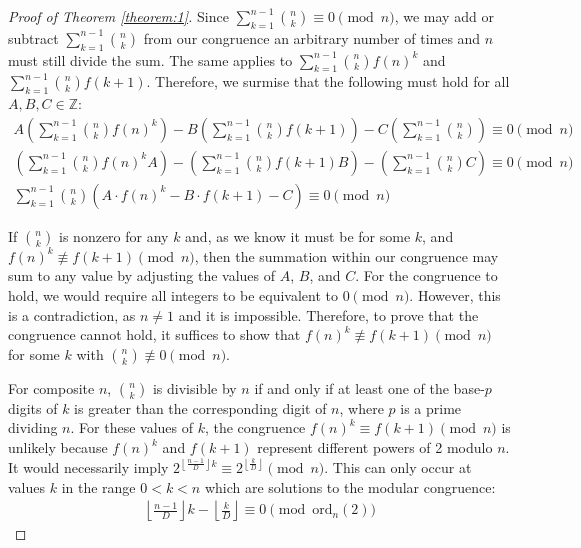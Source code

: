 \documentclass{article}
\theoremstyle{plain}
\theoremstyle{definition}
\begin{document}
\begin{proof}[Proof of Theorem \ref{theorem:1}]
Since $\sum_{k=1}^{n-1} \binom{n}{k} \equiv 0 \pmod{n}$, we may add or subtract $\sum_{k=1}^{n-1} \binom{n}{k}$ from our congruence an arbitrary number of times and $n$ must still divide the sum. The same applies to $\sum_{k=1}^{n-1} \binom{n}{k} f(n)^k$ and $\sum_{k=1}^{n-1} \binom{n}{k} f(k+1)$. Therefore, we surmise that the following must hold for all $A,B,C \in \mathbb{Z}$:
\begin{align}
A \left(\sum_{k=1}^{n-1} \binom{n}{k} f(n)^k\right) - B \left(\sum_{k=1}^{n-1} \binom{n}{k} f(k+1)\right) - C \left(\sum_{k=1}^{n-1} \binom{n}{k}\right) \equiv 0 \pmod{n} \\
\left(\sum_{k=1}^{n-1} \binom{n}{k} f(n)^k A\right) - \left(\sum_{k=1}^{n-1} \binom{n}{k} f(k+1) B\right) - \left(\sum_{k=1}^{n-1} \binom{n}{k} C\right) \equiv 0 \pmod{n} \\
\sum_{k=1}^{n-1} \binom{n}{k} \left( A \cdot f(n)^k - B \cdot f(k+1) - C\right) \equiv 0 \pmod{n}
\end{align}

If $\binom{n}{k}$ is nonzero for any $k$ and, as we know it must be for some $k$, and $f(n)^k \not\equiv f(k+1) \pmod{n}$, then the summation within our congruence may sum to any value by adjusting the values of $A$, $B$, and $C$. For the congruence to hold, we would require all integers to be equivalent to $0 \pmod{n}$. However, this is a contradiction, as $n\not=1$ and it is impossible. Therefore, to prove that the congruence cannot hold, it suffices to show that $f(n)^k \not\equiv f(k+1) \pmod{n}$ for some $k$ with $\binom{n}{k} \not\equiv 0 \pmod{n}$.

For composite \( n \), \( \binom{n}{k} \) is divisible by \( n \) if and only if at least one of the base-\( p \) digits of \( k \) is greater than the corresponding digit of \( n \), where \( p \) is a prime dividing \( n \). For these values of \( k \), the congruence \( f(n)^k \equiv f(k+1) \pmod{n} \) is unlikely because \( f(n)^k \) and \( f(k+1) \) represent different powers of 2 modulo \( n \). It would necessarily imply $2^{\left\lfloor \frac{n-1}{D} \right\rfloor k} \equiv 2^{\left\lfloor \frac{k}{D} \right\rfloor} \pmod{n}$. This can only occur at values $k$ in the range $0 < k < n$ which are solutions to the modular congruence:
\begin{align}
    \left\lfloor \frac{n-1}{D} \right\rfloor k - \left\lfloor \frac{k}{D} \right\rfloor \equiv 0 \pmod{\text{ord}_n(2)}
\end{align}


\end{proof}
\end{document}
